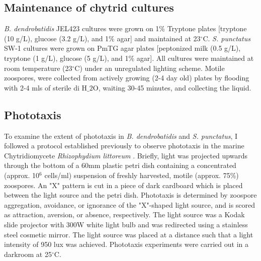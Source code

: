 \subsection*{Maintenance of chytrid cultures}
\textit{B. dendrobatidis} JEL423 cultures were grown on 1\% Tryptone plates [tryptone (10 g/L), glucose (3.2 g/L), and 1\% agar] and maintained at 23$^{\circ}$C. \textit{S. punctatus} SW-1 cultures were grown on PmTG agar plates [peptonized milk (0.5 g/L), tryptone (1 g/L), glucose (5 g/L), and 1\% agar]. All cultures were maintained at room temperature (23$^{\circ}$C) under an unregulated lighting scheme. Motile zoospores, were collected from actively growing (2-4 day old) plates by flooding with 2-4 mls of sterile di H$\_{2}$O, waiting 30-45 minutes, and collecting the liquid. \\
\subsection*{Phototaxis}
To examine the extent of phototaxis in \textit{B. dendrobatidis} and \textit{S. punctatus}, I followed a protocol established previously to observe phototaxis in the marine Chytridiomycete \textit{Rhizophydium littoreum} \cite{Muehlstein1987}. Briefly, light was projected upwards through the bottom of a 60mm plastic petri dish containing a concentrated (approx. 10$^{6}$ cells/ml) suspension of freshly harvested, motile (approx. 75\%) zoospores. An "X" pattern is cut in a piece of dark cardboard which is placed between the light source and the petri dish. Phototaxis is determined by zoospore aggregation, avoidance, or ignorance of the "X"-shaped light source, and is scored as attraction, aversion, or absence, respectively. The light source was a Kodak slide projector with 300W white light bulb and was redirected using a stainless steel cosmetic mirror. The light source was placed at a distance such that a light intensity of 950 lux was achieved. Phototaxis experiments were carried out in a darkroom at 25$^{\circ}$C.\\ 
